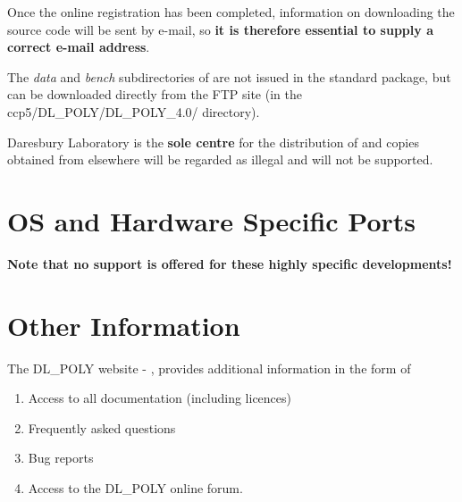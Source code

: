 Once the online registration has been completed, information
on downloading the \D source code will be sent by e-mail, so {\bf
it is therefore essential to supply a correct e-mail address}.

The {\em data} and {\em bench} subdirectories of \D are not issued
in the standard package, but can be downloaded directly from the
FTP site (in the \mbox{ccp5/DL\_POLY/DL\_POLY\_4.0/} directory).

 Daresbury Laboratory is the {\bf sole centre} for
the distribution of \D and copies obtained from elsewhere will be
regarded as illegal and will not be supported.

\section{OS and Hardware Specific Ports}
%
%

{\bf Note that no support is offered for these highly specific
developments!}

\section{Other Information}\label{other}

The DL\_POLY website - \WEB{},
provides additional information in the form of
\begin{enumerate}
\item Access to all documentation (including licences)
\item Frequently asked questions
\item Bug reports
\item Access to the DL\_POLY online forum.
\end{enumerate}

